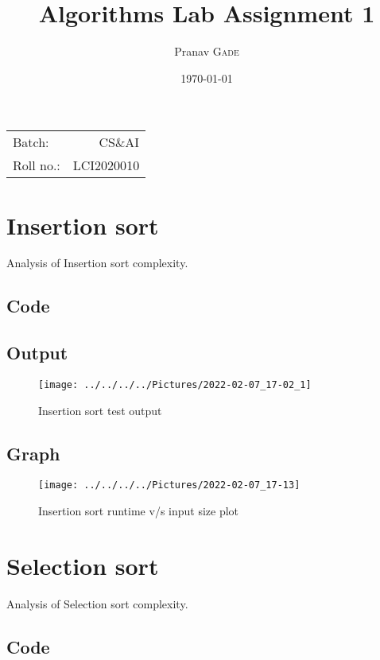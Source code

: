 \documentclass{article}
\title{Algorithms Lab Assignment 1} %
\author{Pranav \textsc{Gade}} %
\date{\today} %
\begin{document}
    \maketitle %

    \begin{center}
        \begin{tabular}{l r}
            Batch:    & CS\&AI     \\
            Roll no.: & LCI2020010
        \end{tabular}
    \end{center}


    \section{Insertion sort}
    Analysis of Insertion sort complexity.
    \subsection{Code}
    

    \subsection{Output}
    \begin{figure}[H]
        \centering
        \texttt{[image: ../../../../Pictures/2022-02-07\_17-02\_1]}
        \caption{Insertion sort test output}
    \end{figure}

    \subsection{Graph}
    \begin{figure}[H]
        \centering
        \texttt{[image: ../../../../Pictures/2022-02-07\_17-13]}
        \caption{Insertion sort runtime v/s input size plot}
    \end{figure}

    \section{Selection sort}
    Analysis of Selection sort complexity.
    \subsection{Code}
    
\end{document}
